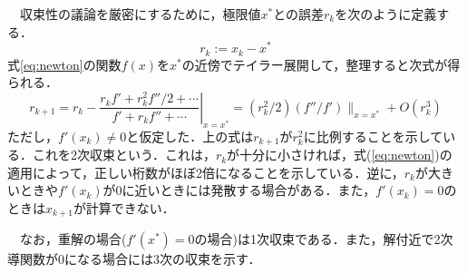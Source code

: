\documentclass[a4j,11pt]{jarticle}
\begin{document}
　収束性の議論を厳密にするために，極限値$x^*$との誤差$r_k$を次のように定義する．
\begin{equation}
r_k:=x_k-x^*
\label{eq:syuusoku}
\end{equation}
式\ref{eq:newton}の関数$f(x)$を$x^*$の近傍でテイラー展開して，整理すると次式が得られる\cite{author1}．
\begin{equation}
r_{k+1}=r_k-\left. \frac{r_kf'+r^2_kf''/2+\cdots}{f'+r_kf''+\cdots} \right|_{x=x^*}
=(r^2_k/2)(f''/f')\|_{x=x^*}+O(r^3_k)
\label{eq:taylor}
\end{equation}
ただし，$f'(x_k)\neq 0$と仮定した．上の式は$r_{k+1}$が$r^2_k$に比例することを示している．これを2次収束という．これは，$r_k$が十分に小さければ，式(\ref{eq:newton})の適用によって，正しい桁数がほぼ2倍になることを示している．逆に，$r_k$が大きいときや$f'(x_k)$が0に近いときには発散する場合がある．また，$f'(x_k)=0$のときは$x_{k+1}$が計算できない．

　なお，重解の場合($f'(x^*)=0$の場合)は1次収束である．また，解付近で2次導関数が0になる場合には3次の収束を示す．
\end{document}
